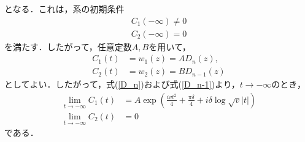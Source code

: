 となる．これは，系の初期条件
\begin{align}
  C_1(-\infty) \ne 0\\
  C_2(-\infty) = 0
\end{align}
を満たす．したがって，任意定数$A,B$を用いて，
\begin{align}
  C_1(t) &= w_1(z) = A D_n(z),\\
  C_2(t) &= w_2(z) = B D_{n-1}(z)
\end{align}
としてよい．したがって，式(\ref{D_n})および式(\ref{D_n-1})より，$t \rightarrow -\infty$のとき，
\begin{align}
  \lim_{t \rightarrow -\infty} C_1(t) &= A \exp \left( \frac{ivt^2}{4} + \frac{\pi \delta}{4} + i\delta \log \sqrt{v} |t| \right) \label{C1_inf}\\
  \lim_{t \rightarrow -\infty} C_2(t) &= 0
\end{align}
である．


